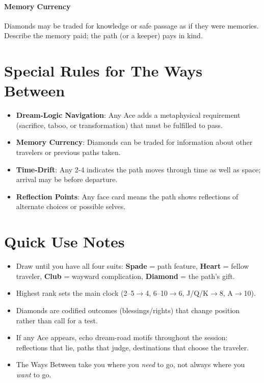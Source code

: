 \paragraph{Memory Currency}
Diamonds may be traded for knowledge or safe passage as if they were memories. Describe the memory paid; the path (or a keeper) pays in kind.

\section*{Special Rules for The Ways Between}
\label{sec:ways-between-special-rules}
\begin{itemize}
\item \textbf{Dream-Logic Navigation}: Any Ace adds a metaphysical requirement (sacrifice, taboo, or transformation) that must be fulfilled to pass.
\item \textbf{Memory Currency}: Diamonds can be traded for information about other travelers or previous paths taken.
\item \textbf{Time-Drift}: Any 2-4 indicates the path moves through time as well as space; arrival may be before departure.
\item \textbf{Reflection Points}: Any face card means the path shows reflections of alternate choices or possible selves.
\end{itemize}

\section*{Quick Use Notes}
\label{sec:ways-between-quick-use}
\begin{itemize}
\item Draw until you have all four suits: \textbf{Spade} = path feature, \textbf{Heart} = fellow traveler, \textbf{Club} = wayward complication, \textbf{Diamond} = the path's gift.
\item Highest rank sets the main clock (2--5$\rightarrow$4, 6--10$\rightarrow$6, J/Q/K$\rightarrow$8, A$\rightarrow$10).
\item Diamonds are codified outcomes (blessings/rights) that change position rather than call for a test.
\item If any Ace appears, echo dream-road motifs throughout the session: reflections that lie, paths that judge, destinations that choose the traveler.
\item The Ways Between take you where you \emph{need} to go, not always where you \emph{want} to go.
\end{itemize}

